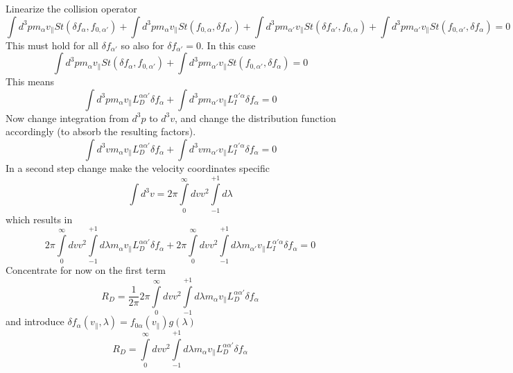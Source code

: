Linearize the collision operator
\begin{equation}
    \int d^3p m_{\alpha} v_{\parallel} St(\delta f_{\alpha}, f_{0,\alpha'})
  + \int d^3p m_{\alpha} v_{\parallel} St(f_{0,\alpha}, \delta f_{\alpha'})
  + \int d^3p m_{\alpha'} v_{\parallel} St(\delta f_{\alpha'}, f_{0, \alpha})
  + \int d^3p m_{\alpha'} v_{\parallel} St(f_{0,\alpha'}, \delta f_{\alpha}) = 0
\end{equation}
This must hold for all $\delta f_{\alpha'}$ so also for $\delta f_{\alpha'} = 0$.
In this case
\begin{equation}
    \int d^3p m_{\alpha} v_{\parallel} St(\delta f_{\alpha}, f_{0,\alpha'})
  + \int d^3p m_{\alpha'} v_{\parallel} St(f_{0,\alpha'}, \delta f_{\alpha}) = 0
\end{equation}
This means
\begin{equation}
    \int d^3p m_{\alpha} v_{\parallel} L_D^{\alpha\alpha'} \delta f_{\alpha}
  + \int d^3p m_{\alpha'} v_{\parallel} L_I^{\alpha'\alpha} \delta f_{\alpha} = 0
\end{equation}
Now change integration from $d^3p$ to $d^3v$, and change the distribution
function accordingly (to absorb the resulting factors).
\begin{equation}
    \int d^3v m_{\alpha} v_{\parallel} L_D^{\alpha\alpha'} \delta f_{\alpha}
  + \int d^3v m_{\alpha'} v_{\parallel} L_I^{\alpha'\alpha} \delta f_{\alpha} = 0
\end{equation}
In a second step change make the velocity coordinates specific
\begin{equation}
  \int d^3v = 2\pi \int\limits_{0}^{\infty} dv v^2 \int\limits_{-1}^{+1} d\lambda
\end{equation}
which results in
\begin{equation}
    2\pi \int\limits_{0}^{\infty} dv v^2 \int\limits_{-1}^{+1} d\lambda m_{\alpha} v_{\parallel} L_D^{\alpha\alpha'} \delta f_{\alpha}
  + 2\pi \int\limits_{0}^{\infty} dv v^2 \int\limits_{-1}^{+1} d\lambda m_{\alpha'} v_{\parallel} L_I^{\alpha'\alpha} \delta f_{\alpha} = 0
\end{equation}
Concentrate for now on the first term
\begin{equation}
  R_D = \frac{1}{2\pi} 2\pi \int\limits_{0}^{\infty} dv v^2 \int\limits_{-1}^{+1} d\lambda m_{\alpha} v_{\parallel} L_D^{\alpha\alpha'} \delta f_{\alpha}
\end{equation}
and introduce $\delta f_{\alpha} (v_{\parallel}, \lambda) = f_{0\alpha}(v_{\parallel}) g(\lambda)$
\begin{equation}
  R_D = \int\limits_{0}^{\infty} dv v^2 \int\limits_{-1}^{+1} d\lambda m_{\alpha} v_{\parallel} L_D^{\alpha\alpha'} \delta f_{\alpha}
\end{equation}

